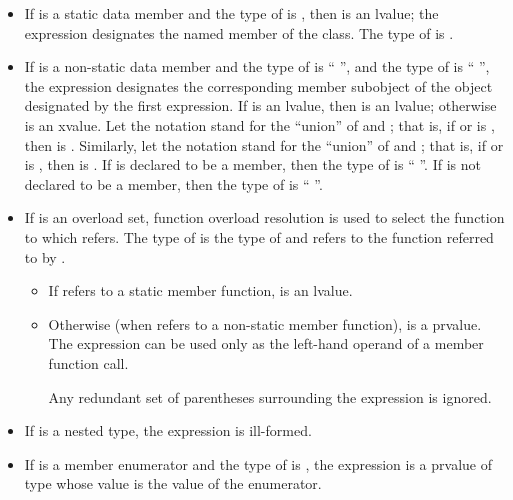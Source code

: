 \begin{itemize}
\item If  is a static data member and the type of 
is , then  is an lvalue; the expression designates
the named member of the class. The type of  is .

\item If  is a non-static data member and the type of
 is `` '', and the type of 
is `` '', the expression designates the corresponding
member subobject of the object designated by the first expression. If 
is an lvalue, then  is an lvalue;
otherwise  is an xvalue.
Let the notation  stand for the ``union'' of
 and ; that is, if  or 
is , then  is . Similarly,
let the notation  stand for the ``union'' of 
and ; that is, if  or  is
, then  is . If  is
declared to be a  member, then the type of 
is `` ''. If  is not declared to be a
 member, then the type of  is
``  ''.

\item If  is an overload set,
function overload resolution
is used to select the function to which  refers.
The type of  is the type of 
and  refers to the function referred to by .

\begin{itemize}
\item If  refers to a static member function,
 is an lvalue.

\item Otherwise (when  refers to a non-static member function),
 is a prvalue. The expression can be used only as the
left-hand operand of a member function call.
\begin{note}
Any redundant set of parentheses surrounding the expression
is ignored.
\end{note}
\end{itemize}

\item If  is a nested type, the expression  is
ill-formed.

\item If  is a member enumerator and the type of 
is , the expression  is a prvalue of type 
whose value is the value of the enumerator.
\end{itemize}

